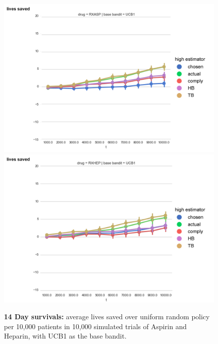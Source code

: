 \begin{figure}
\begin{center}
\includegraphics[width=1\columnwidth]{bandit/figs/fig1-5.jpg}
\includegraphics[width=1\columnwidth]{bandit/figs/fig1-6.jpg}
\caption{\textbf{14 Day survivals:} average lives saved over uniform random policy per 10,000 patients in 10,000 simulated trials of Aspirin and Heparin, with UCB1 as the base bandit.}
\end{center}
\end{figure} 
